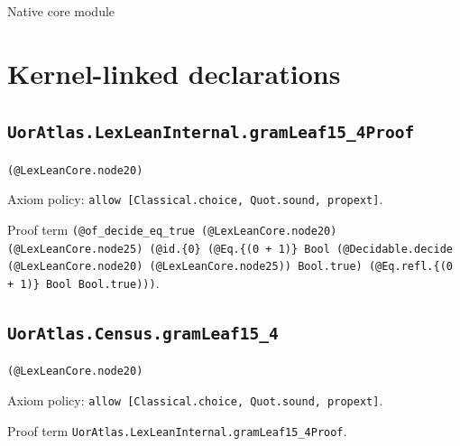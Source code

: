 \documentclass[11pt]{article}
\begin{document}
\begin{center}{\LARGE Native core module}\end{center}
\section*{Kernel-linked declarations}
\subsection*{\texttt{UorAtlas.LexLeanInternal.gramLeaf15\_4Proof}}
\noindent\texttt{(@LexLeanCore.node20)}\par
\noindent Axiom policy: \texttt{allow [Classical.choice, Quot.sound, propext]}.\par
\noindent Proof term \texttt{(@of\_decide\_eq\_true (@LexLeanCore.node20) (@LexLeanCore.node25) (@id.\{0\} (@Eq.\{(0 + 1)\} Bool (@Decidable.decide (@LexLeanCore.node20) (@LexLeanCore.node25)) Bool.true) (@Eq.refl.\{(0 + 1)\} Bool Bool.true)))}.\par
\subsection*{\texttt{UorAtlas.Census.gramLeaf15\_4}}
\noindent\texttt{(@LexLeanCore.node20)}\par
\noindent Axiom policy: \texttt{allow [Classical.choice, Quot.sound, propext]}.\par
\noindent Proof term \texttt{UorAtlas.LexLeanInternal.gramLeaf15\_4Proof}.\par
\end{document}
